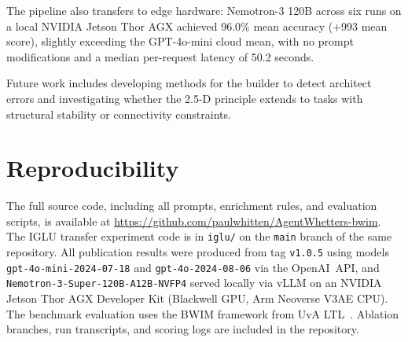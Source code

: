 \documentclass{article}
\begin{document}
The pipeline also transfers to edge hardware: Nemotron-3
120B across six runs on a local NVIDIA Jetson Thor AGX achieved 96.0\%
mean accuracy (+993 mean score), slightly exceeding
the GPT-4o-mini cloud mean, with no prompt modifications and a median
per-request latency of 50.2 seconds.

Future work includes developing methods for the builder to detect
architect errors and investigating whether the 2.5-D principle extends
to tasks with structural stability or connectivity constraints.

\section*{Reproducibility}
\begingroup\sloppy

The full source code, including all prompts, enrichment rules, and
evaluation scripts, is available at
\url{https://github.com/paulwhitten/AgentWhetters-bwim}.
The IGLU transfer experiment code is in
\texttt{iglu/} on the \texttt{main} branch of the same repository.
All publication results were produced from tag \texttt{v1.0.5} using
models \texttt{gpt-4o-mini-}{\allowbreak}\texttt{2024-07-18}
and \texttt{gpt-4o-}{\allowbreak}\texttt{2024-08-06} via the
OpenAI~API, and
\texttt{Nemotron-3-Super-}{\allowbreak}\texttt{120B-A12B-}{\allowbreak}\texttt{NVFP4}
served locally via vLLM on an NVIDIA Jetson Thor AGX Developer Kit
(Blackwell GPU, Arm Neoverse V3AE CPU).
The benchmark evaluation
uses the BWIM framework from UvA LTL~\cite{bwim}. Ablation branches, run
transcripts, and scoring logs are included in the repository.
\endgroup



\end{document}
